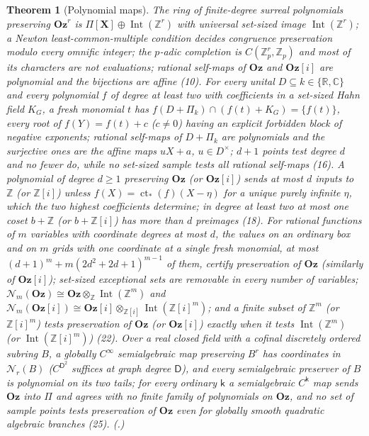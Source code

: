 \documentclass[11pt,letterpaper]{article}
\numberwithin{equation}{section}
\theoremstyle{definition}
\theoremstyle{remark}
\theoremstyle{plain}
\newtheorem{maintheorem}{Theorem}
\newcommand{\Oz}{\mathbf{Oz}}
\newcommand{\GOz}{\Oz[i]}
\newcommand{\Z}{\mathbb Z}
\newcommand{\R}{\mathbb R}
\newcommand{\C}{\mathbb C}
\newcommand{\ct}{\operatorname{ct}}
\newcommand{\Int}{\operatorname{Int}}
\newcommand{\Num}{\mathscr N}
\begin{document}
\begin{maintheorem}[Polynomial maps]\label{osq:main:polynomial}
The ring of finite-degree surreal polynomials preserving $\Oz^r$ is $\Pi[\mathbf X]\oplus\Int(\Z^r)$
with universal set-sized image $\Int(\Z^r)$; a Newton least-common-multiple condition decides
congruence preservation modulo every omnific integer; the $p$-adic completion is $C(\Z_p^r,\Z_p)$
and most of its characters are not evaluations; rational self-maps of $\Oz$ and $\GOz$ are
polynomial and the bijections are affine (10). For every unital $D\subseteq k\in\{\R,\C\}$ and every
polynomial $f$ of degree at least two with coefficients in a set-sized Hahn field $K_G$, a fresh
monomial $t$ has $f(D+\Pi_k)\cap(f(t)+K_G)=\{f(t)\}$, every root of $f(Y)=f(t)+c$ ($c\ne0$) having an
explicit forbidden block of negative exponents; rational self-maps of $D+\Pi_k$ are polynomials and the
surjective ones are the affine maps $uX+a$, $u\in D^\times$; $d+1$ points test degree $d$ and no fewer do,
while no set-sized sample tests all rational self-maps (16). A polynomial of degree $d\ge1$ preserving
$\Oz$ (or $\GOz$) sends at most $d$ inputs to $\Z$ (or $\Z[i]$) unless $f(X)=\ct_*(f)(X-\eta)$ for a
unique purely infinite $\eta$, which the two highest coefficients determine; in degree at least two at
most one coset $b+\Z$ (or $b+\Z[i]$) has more than $d$ preimages (18). For rational functions of $m$ variables with
coordinate degrees at most $d$, the values on an ordinary box and on $m$ grids with one coordinate at a single fresh monomial, at most
$(d+1)^m+m(2d^2+2d+1)^{m-1}$ of them, certify preservation of $\Oz$ (similarly of $\GOz$); set-sized exceptional sets are removable in
every number of variables; $\Num_m(\Oz)\cong\Oz\otimes_\Z\Int(\Z^m)$ and $\Num_m(\GOz)\cong\GOz\otimes_{\Z[i]}\Int(\Z[i]^m)$; and a
finite subset of $\Z^m$ (or $\Z[i]^m$) tests preservation of $\Oz$ (or $\GOz$) exactly when it tests $\Int(\Z^m)$ (or $\Int(\Z[i]^m)$) (22).
Over a real closed field with a cofinal discretely ordered subring $B$, a globally $C^\infty$ semialgebraic map preserving $B^r$ has
coordinates in $\Num_r(B)$ ($C^{\mathsf D^2}$ suffices at graph degree $\mathsf D$), and every semialgebraic preserver of $B$ is polynomial on its two
tails; for every ordinary $\mathsf k$ a semialgebraic $C^{\mathsf k}$ map sends $\Oz$ into $\Pi$ and agrees with no finite family of polynomials on
$\Oz$, and no set of sample points tests preservation of $\Oz$ even for globally smooth quadratic algebraic branches (25).
(.)
\end{maintheorem}
\end{document}
